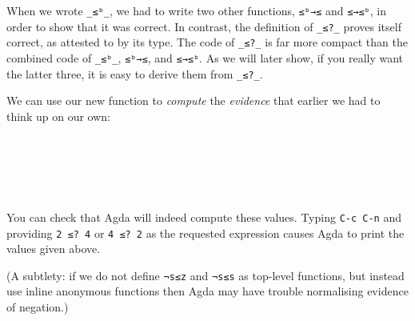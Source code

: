 When we wrote \texttt{\_≤ᵇ\_}, we had to write two other functions,
\texttt{≤ᵇ→≤} and \texttt{≤→≤ᵇ}, in order to show that it was correct.
In contrast, the definition of \texttt{\_≤?\_} proves itself correct, as
attested to by its type. The code of \texttt{\_≤?\_} is far more compact
than the combined code of \texttt{\_≤ᵇ\_}, \texttt{≤ᵇ→≤}, and
\texttt{≤→≤ᵇ}. As we will later show, if you really want the latter
three, it is easy to derive them from \texttt{\_≤?\_}.

We can use our new function to \emph{compute} the \emph{evidence} that
earlier we had to think up on our own:

\begin{fence}
\begin{code}%
\>[0]\AgdaFunction{\AgdaUnderscore{}}\AgdaSpace{}%
\AgdaSymbol{:}\AgdaSpace{}%
\AgdaSpace{}%
\AgdaSpace{}%
\AgdaSpace{}%
\AgdaSpace{}%
\AgdaSpace{}%
\AgdaSymbol{(}\AgdaSpace{}%
\AgdaSymbol{(}\AgdaSpace{}%
\AgdaSymbol{))}\<%
\\
\>[0]\AgdaSymbol{\AgdaUnderscore{}}\AgdaSpace{}%
\AgdaSymbol{=}\AgdaSpace{}%
\<%
\\
%
\\[\AgdaEmptyExtraSkip]%
\>[0]\AgdaFunction{\AgdaUnderscore{}}\AgdaSpace{}%
\AgdaSymbol{:}\AgdaSpace{}%
\AgdaSpace{}%
\AgdaSpace{}%
\AgdaSpace{}%
\AgdaSpace{}%
\AgdaSpace{}%
\AgdaSymbol{(}\AgdaSpace{}%
\AgdaSymbol{(}\AgdaSpace{}%
\AgdaSymbol{))}\<%
\\
\>[0]\AgdaSymbol{\AgdaUnderscore{}}\AgdaSpace{}%
\AgdaSymbol{=}\AgdaSpace{}%
\<%
\end{code}
\end{fence}

You can check that Agda will indeed compute these values. Typing
\texttt{C-c\ C-n} and providing \texttt{2\ ≤?\ 4} or \texttt{4\ ≤?\ 2}
as the requested expression causes Agda to print the values given above.

(A subtlety: if we do not define \texttt{¬s≤z} and \texttt{¬s≤s} as
top-level functions, but instead use inline anonymous functions then
Agda may have trouble normalising evidence of negation.)

